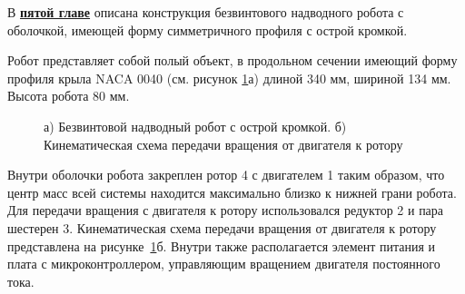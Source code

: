 В \underline{\textbf{пятой главе}} описана конструкция безвинтового надводного робота с оболочкой, имеющей форму симметричного профиля с острой кромкой.

Робот представляет собой полый объект, в продольном сечении имеющий форму профиля крыла NACA 0040 (см. рисунок \ref{Photo_NACA}а) длиной 340 мм, шириной 134 мм. Высота робота 80 мм. 



\begin{figure}[h]
	\begin{minipage}[h]{0.5\linewidth}
	\end{minipage}
	\hfill
	\begin{minipage}[h]{0.5\linewidth}
	\end{minipage}
	
	\begin{minipage}[h]{0.5\linewidth}
	\end{minipage}
	\hfill
	\begin{minipage}[h]{0.5\linewidth}
	\end{minipage}
	\caption{а) Безвинтовой надводный робот с острой кромкой. б) Кинематическая схема передачи вращения от двигателя к ротору}
	\label{Photo_NACA}
\end{figure}

Внутри оболочки робота закреплен ротор 4 с двигателем 1 таким образом, что центр масс всей системы находится максимально близко к нижней грани робота. Для передачи вращения с двигателя к ротору использовался редуктор 2 и пара шестерен 3. Кинематическая схема передачи вращения от двигателя к ротору представлена на рисунке~\ref{Photo_NACA}б. Внутри также располагается элемент питания и плата с микроконтроллером, управляющим вращением двигателя постоянного тока. %


